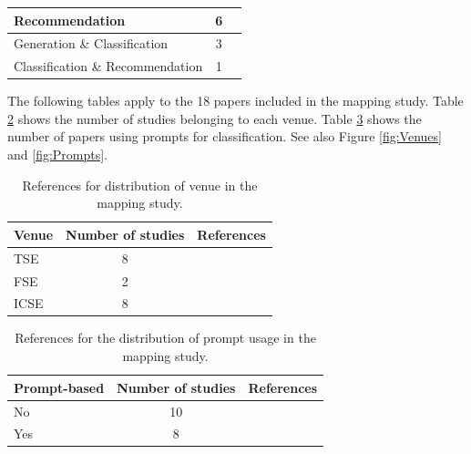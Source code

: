 \documentclass[a4paper]{article}
\begin{document}
\begin{appendices}
\begin{table}[ht]
\begin{tabularx}{\textwidth}{|l|c|X|}
		Recommendation & 6 & \cite{10.1145/3597503.3623342,10.1145/3597503.3639188,10.1145/3597503.3639187,10.1145/3663529.3663826,10.1145/3663529.3663803,10697930} \\ \hline
		Generation \& Classification & 3 & 
		\cite{10.1145/3597503.3639216,10599336,10704582} \\ \hline
		Classification \& Recommendation & 1 & \cite{10.1145/3597503.3623322} \\ \hline
	\end{tabularx} \label{refs:application_types}
\end{table}


The following tables apply to the 18 papers included in the mapping study. Table \ref{refs:venues} shows the number of studies belonging to each venue. Table \ref{refs:prompts} shows the number of papers using prompts for classification.
See also Figure \ref{fig:Venues} and \ref{fig:Prompts}.
\begin{table}[ht]
	\caption{References for distribution of venue in the mapping study.}
	\begin{tabularx}{\textwidth}{|l|c|X|}
		\hline
		\textbf{Venue} & \textbf{Number of studies} & \textbf{References} \\ \hline
		TSE & 8 & \cite{10323231,10402095,10586831,10648982,10659742,10746847,10599336,10704582} \\ \hline
		FSE & 2 & \cite{10.1145/3663529.3663785,10.1145/3663529.3663794} \\ \hline
		ICSE & 8 & \cite{10.1145/3597503.3623345,10.1145/3597503.3623304,10.1145/3597503.3639217,10.1145/3597503.3639117,10.1145/3597503.3639194,10.1145/3597503.3639202,10.1145/3597503.3639216,10.1145/3597503.3623322} \\ \hline
	\end{tabularx}
	\label{refs:venues}
\end{table}

\begin{table}[ht]
	\caption{References for the distribution of prompt usage in the mapping study.}
	\begin{tabularx}{\textwidth}{|l|c|X|}
		\hline
		\textbf{Prompt-based} & \textbf{Number of studies} & \textbf{References} \\ \hline
		No & 10 & \cite{10.1145/3597503.3623345,10.1145/3597503.3623304,10.1145/3597503.3639217,10.1145/3597503.3639202,10323231,10402095,10586831,10.1145/3597503.3639216,10704582,10.1145/3597503.3623322} \\ \hline
		Yes & 8 & \cite{10.1145/3597503.3639117,10.1145/3597503.3639194,10.1145/3663529.3663785,10.1145/3663529.3663794,10648982,10659742,10746847,10599336} \\ \hline
	\end{tabularx}
	\label{refs:prompts}
\end{table}


\end{appendices}
\end{document}
